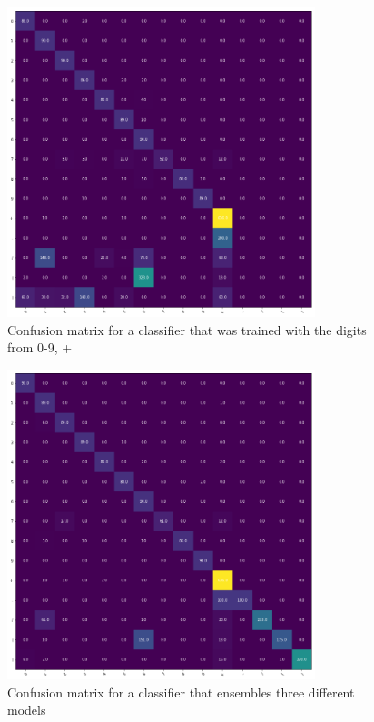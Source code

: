\documentclass[11pt]{article}
\begin{document}
	\begin{figure}[H]
		\includegraphics[width=0.8\textwidth]{ImagesForReport/confusion_matrix_digits_plus.png}
		\caption{Confusion matrix for a classifier that was trained with the digits from 0-9, +}
		\label{fig:mat-single}
	\end{figure}
	
	\begin{figure}[H]
		\includegraphics[width=0.8\textwidth]{ImagesForReport/confusion_matrix_ensemble.png}
		\caption{Confusion matrix for a classifier that ensembles three different models}
		\label{fig:mat-ensemble}
	\end{figure}
	
\end{document}
